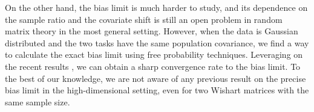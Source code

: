 On the other hand, the bias limit is much harder to study, and its dependence on the sample ratio and the covariate shift is still an open problem in random matrix theory in the most general setting. However, when the data is Gaussian distributed and the two tasks have the same population covariance, we find a way to calculate the exact bias limit using free probability techniques. Leveraging on the recent results \cite{BES_free1,BES_free2}, we can obtain a sharp convergence rate to the bias limit. To the best of our knowledge, we are not aware of any previous result on the precise bias limit in the high-dimensional setting, even for two Wishart matrices with the same sample size. 









